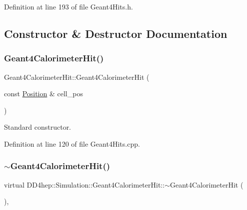 Definition at line 193 of file Geant4\+Hits.\+h.



\subsection{Constructor \& Destructor Documentation}
\hypertarget{class_d_d4hep_1_1_simulation_1_1_geant4_calorimeter_hit_abbd57e0eab3a707b644a29c32006228c}{}\label{class_d_d4hep_1_1_simulation_1_1_geant4_calorimeter_hit_abbd57e0eab3a707b644a29c32006228c} 
\subsubsection{\texorpdfstring{Geant4\+Calorimeter\+Hit()}{Geant4CalorimeterHit()}}
{\footnotesize\ttfamily Geant4\+Calorimeter\+Hit\+::\+Geant4\+Calorimeter\+Hit (\begin{DoxyParamCaption}\item[{const \hyperlink{namespace_d_d4hep_1_1_geometry_a55083902099d03506c6db01b80404900}{Position} \&}]{cell\+\_\+pos }\end{DoxyParamCaption})}



Standard constructor. 



Definition at line 120 of file Geant4\+Hits.\+cpp.

\hypertarget{class_d_d4hep_1_1_simulation_1_1_geant4_calorimeter_hit_aa1c4edd85a2375d70f7cfc135f17b9cb}{}\label{class_d_d4hep_1_1_simulation_1_1_geant4_calorimeter_hit_aa1c4edd85a2375d70f7cfc135f17b9cb} 
\subsubsection{\texorpdfstring{$\sim$\+Geant4\+Calorimeter\+Hit()}{~Geant4CalorimeterHit()}}
{\footnotesize\ttfamily virtual D\+D4hep\+::\+Simulation\+::\+Geant4\+Calorimeter\+Hit\+::$\sim$\+Geant4\+Calorimeter\+Hit (\begin{DoxyParamCaption}{ }\end{DoxyParamCaption})\hspace{0.3cm}{\ttfamily [inline]}, {\ttfamily [virtual]}}



